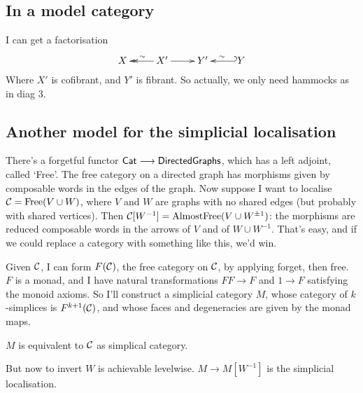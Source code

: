 \documentclass[11pt]{article}
\begin{document}
\begin{SaulSimplicialLocalisation}
\subsection*{In a model category}
I can get a factorisation
\[\xymatrix{
X&\ar@{->>}[l]_\sim X'\ar[r]&Y'\ar@{_{(}->}[r];[]_\sim&Y
}\]
Where $X'$ is cofibrant, and $Y'$ is fibrant. So actually, we only need hammocks as in diag 3.
\subsection*{Another model for the simplicial localisation}
There's a forgetful functor $\operatorname{{\mathsf{Cat}}}\longrightarrow\mathsf{DirectedGraphs}$, which has a left adjoint, called `Free'. The free category on a directed graph has morphisms given by composable words in the edges of the graph. Now suppose I want to localise $\mathcal{C}=\text{Free}(V\cup W)$, where $V$ and $W$ are graphs with no shared edges (but probably with shared vertices). Then $\mathcal{C}[W^{-1}]=\text{AlmostFree}(V\cup W^{\pm1})$:  the morphisms are reduced composable words in the arrows of $V$ and of $W\cup W^{-1}$. That's easy, and if we could replace a category with something like this, we'd win.

Given $\mathcal{C}$, I can form $F(\mathcal{C})$, the free category on $\mathcal{C}$, by applying forget, then free. $F$ is a monad, and I have natural transformations $FF\to F$ and $1\to F$ satisfying the monoid axioms. So I'll construct a simplicial category $M$, whose category of $k$-simplices is $F^{k+1}(\mathcal{C})$, and whose faces and degeneracies are given by the monad maps.

\begin{fact}
$M$ is equivalent to $\mathcal{C}$ as  simplical category.
\end{fact}
\noindent But now to invert $W$ is achievable levelwise. $M\to M[W^{-1}]$ is the simplicial localisation.

\end{SaulSimplicialLocalisation}
\end{document}
